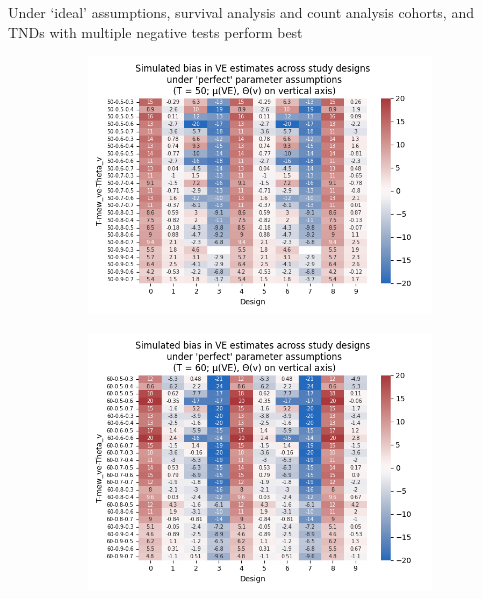 \documentclass[aspectratio=169]{beamer}
\begin{document}
\begin{frame}{Under `ideal' assumptions, survival analysis and count analysis cohorts, and TNDs with multiple negative tests perform best}
\begin{figure}[H]
		\begin{subfigure}[c]{0.31\linewidth}
			\centering
			\includegraphics[scale=0.28]{VEMethod_Sim1b_PureDesignBias_Heatmap50.png}
		\end{subfigure}
		\begin{subfigure}[c]{0.31\linewidth}
			\centering
			\includegraphics[scale=0.28]{VEMethod_Sim1b_PureDesignBias_Heatmap60.png}
		\end{subfigure}
		\begin{subfigure}[c]{0.31\linewidth}
			\centering

\end{subfigure}
\end{figure}
\end{frame}
\end{document}
